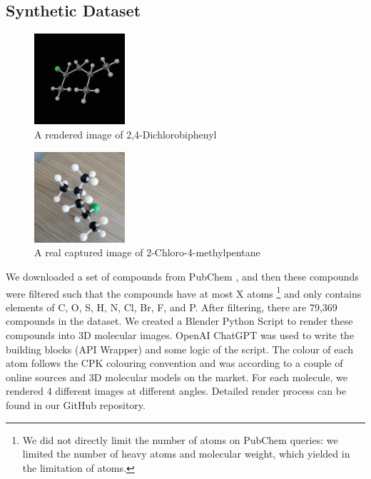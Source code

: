 \documentclass{article}
\begin{document}
\subsection{Synthetic Dataset}
\begin{figure}
    \centering
    \includegraphics[width=0.3\textwidth]{generated}
    \caption{A rendered image of 2,4-Dichlorobiphenyl}
    \label{fig:enter-label}
\end{figure}
\begin{figure}
    \centering
    \includegraphics[width=0.3\textwidth]{cap}
    \caption{A real captured image of 2-Chloro-4-methylpentane}
    \label{fig:enter-label}
\end{figure}
We downloaded a set of compounds from PubChem \autocite{kim_pubchem_2023}, and then these compounds were filtered such that the compounds have at most X atoms \footnote{We did not directly limit the number of atoms on PubChem queries: we limited the number of heavy atoms and molecular weight, which yielded in the limitation of atoms.} and only contains elements of C, O, S, H, N, Cl, Br, F, and P.
After filtering, there are 79,369 compounds in the dataset. We created a Blender Python Script to render these compounds into 3D molecular images. OpenAI ChatGPT was used to write the building blocks (API Wrapper) and some logic of the script. The colour of each atom follows the CPK colouring convention and was according to a couple of online sources and 3D molecular models on the market. For each molecule, we rendered 4 different images at different angles. Detailed render process can be found in our GitHub repository. 
\end{document}
